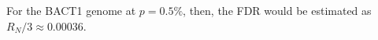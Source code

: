 For the BACT1 genome at $p = 0.5\%$, then,
the FDR would be estimated as $R_N / 3 \approx 0.00036$.
\endinput